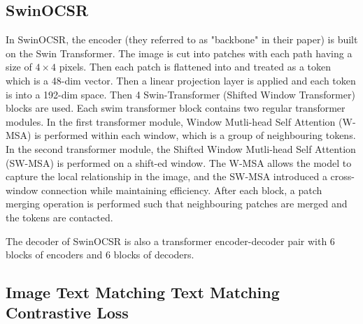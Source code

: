 \documentclass{article}
\begin{document}
\subsection{SwinOCSR}
In SwinOCSR, the encoder (they referred to as "backbone" in their paper) is built on the Swin Transformer. The image is cut into patches with each path having a size of $4 \times 4$ pixels. Then each patch is flattened into and treated as a token which is a 48-dim vector. Then a linear projection layer is applied and each token is into a 192-dim space. 
Then 4 Swin-Transformer (Shifted Window Transformer) \autocite{swin_tran} blocks are used. Each swim transformer block contains two regular transformer modules. In the first transformer module, Window Mutli-head Self Attention (W-MSA) is performed within each window, which is a group of neighbouring tokens. In the second transformer module, the Shifted Window Mutli-head Self Attention (SW-MSA) is performed on a shift-ed window. The W-MSA allows the model to capture the local relationship in the image, and the SW-MSA introduced a cross-window connection while maintaining efficiency. After each block, a patch merging operation is performed such that neighbouring patches are merged and the tokens are contacted. \autocite{swin_tran} \autocite{swinocsr}



The decoder of SwinOCSR is also a transformer encoder-decoder pair with 6 blocks of encoders and 6 blocks of decoders. 
\subsection{Image Text Matching Text Matching Contrastive Loss }
\end{document}
